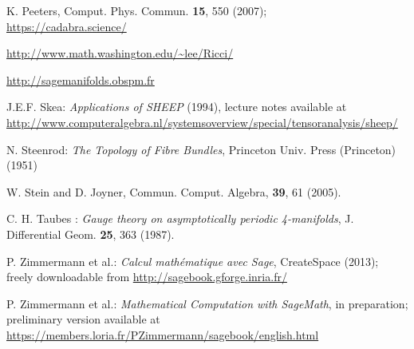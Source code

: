 \begin{thebibliography}{123}
K. Peeters, Comput. Phys. Commun. {\bf 15}, 550 (2007);\\
\url{https://cadabra.science/}

\url{http://www.math.washington.edu/~lee/Ricci/}

\url{http://sagemanifolds.obspm.fr}

J.E.F. Skea: \emph{Applications of SHEEP} (1994), lecture notes available at
\url{http://www.computeralgebra.nl/systemsoverview/special/tensoranalysis/sheep/}

N. Steenrod: \emph{The Topology of Fibre Bundles}, Princeton Univ. Press (Princeton) (1951)

W. Stein and D. Joyner, Commun. Comput. Algebra, {\bf 39}, 61 (2005).

C. H. Taubes : {\em Gauge theory on asymptotically periodic 4-manifolds},
J. Differential Geom. {\bf 25}, 363 (1987).

P. Zimmermann et al.: {\it Calcul math\'ematique avec Sage}, CreateSpace (2013);
freely downloadable from \url{http://sagebook.gforge.inria.fr/}

P. Zimmermann et al.: {\it Mathematical Computation with SageMath},
in preparation; preliminary version available at
\url{https://members.loria.fr/PZimmermann/sagebook/english.html}

\end{thebibliography}
